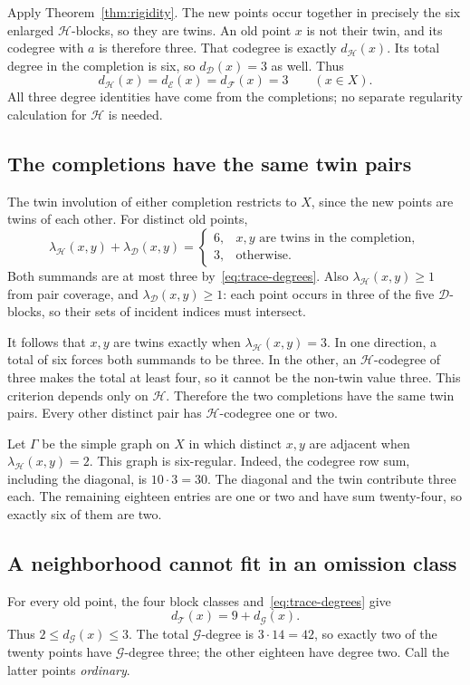 \documentclass[11pt,letterpaper]{article}
\theoremstyle{definition}\newtheorem{definition}[theorem]{Definition}
\theoremstyle{remark}\newtheorem{remark}[theorem]{Remark}
\newcommand{\calF}{\mathcal F}
\newcommand{\calT}{\mathcal T}
\newcommand{\calH}{\mathcal H}
\newcommand{\calE}{\mathcal E}
\newcommand{\calG}{\mathcal G}
\newcommand{\calD}{\mathcal D}
\newcommand{\lam}{\lambda}
\begin{document}
Apply Theorem~\ref{thm:rigidity}. The new points occur together in precisely the six enlarged $\calH$-blocks, so they are twins. An old point $x$ is not their twin, and its codegree with $a$ is therefore three. That codegree is exactly $d_{\calH}(x)$. Its total degree in the completion is six, so $d_{\calD}(x)=3$ as well. Thus
\begin{equation}\label{eq:trace-degrees}
 d_{\calH}(x)=d_{\calE}(x)=d_{\calF}(x)=3\qquad(x\in X).
\end{equation}
All three degree identities have come from the completions; no separate regularity calculation for $\calH$ is needed.

\subsection{The completions have the same twin pairs}
The twin involution of either completion restricts to $X$, since the new points are twins of each other. For distinct old points,
\begin{equation}\label{eq:completion-codegrees}
 \lam_{\calH}(x,y)+\lam_{\calD}(x,y)=
 \begin{cases}
 6,&x,y\text{ are twins in the completion},\\
 3,&\text{otherwise}.
 \end{cases}
\end{equation}
Both summands are at most three by~\eqref{eq:trace-degrees}. Also $\lam_{\calH}(x,y)\ge1$ from pair coverage, and $\lam_{\calD}(x,y)\ge1$: each point occurs in three of the five $\calD$-blocks, so their sets of incident indices must intersect.

It follows that $x,y$ are twins exactly when $\lam_{\calH}(x,y)=3$. In one direction, a total of six forces both summands to be three. In the other, an $\calH$-codegree of three makes the total at least four, so it cannot be the non-twin value three. This criterion depends only on $\calH$. Therefore the two completions have the same twin pairs. Every other distinct pair has $\calH$-codegree one or two.

Let $\Gamma$ be the simple graph on $X$ in which distinct $x,y$ are adjacent when $\lam_{\calH}(x,y)=2$. This graph is six-regular. Indeed, the codegree row sum, including the diagonal, is $10\cdot3=30$. The diagonal and the twin contribute three each. The remaining eighteen entries are one or two and have sum twenty-four, so exactly six of them are two.

\subsection{A neighborhood cannot fit in an omission class}
For every old point, the four block classes and~\eqref{eq:trace-degrees} give
\[
 d_{\calT}(x)=9+d_{\calG}(x).
\]
Thus $2\le d_{\calG}(x)\le3$. The total $\calG$-degree is $3\cdot14=42$, so exactly two of the twenty points have $\calG$-degree three; the other eighteen have degree two. Call the latter points \emph{ordinary}.
\end{document}
